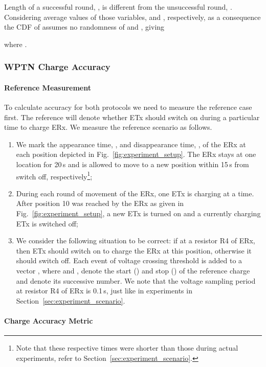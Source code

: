 \documentclass[11pt,draftclsnofoot,journal,onecolumn]{IEEEtran}
\newcommand{\rxVoltageThreshold}{}
\begin{document}
Length of a successful round, , is different from the unsuccessful round, . Considering average values of those variables,  and , respectively, as a consequence the CDF of  assumes no randomness of  and , giving

where .

\subsubsection{WPTN Charge Accuracy}
\label{sec:charge_accuracy_metric}

\paragraph{Reference Measurement}

To calculate accuracy for both protocols we need to measure the reference case first. The reference will denote whether ETx should switch on during a particular time to charge ERx. We measure the reference scenario as follows.
\begin{enumerate}
\item We mark the appearance time, , and disappearance time, , of the ERx at each position depicted in Fig.~\ref{fig:experiment_setup}. The ERx stays at one location for 20\,s and is allowed to move to a new position within 15\,s from switch off, respectively\footnote{Note that these respective times were shorter than those during actual experiments, refer to Section~\ref{sec:experiment_scenario}.};
\item During each round of movement of the ERx, one ETx is charging at a time. After position 10 was reached by the ERx as given in Fig.~\ref{fig:experiment_setup}, a new ETx is turned on and a currently charging ETx is switched off;
\item We consider the following situation to be correct: if \rxVoltageThreshold at a resistor R4 of ERx, then ETx  should switch on to charge the ERx at this position, otherwise it should switch off. Each event of voltage crossing threshold is added to a vector  , where  and ,  denote the start () and stop () of the reference charge and  denote its successive number. We note that the voltage sampling period at resistor R4 of ERx is 0.1\,s, just like in experiments in Section~\ref{sec:experiment_scenario}.
\end{enumerate}

\paragraph{Charge Accuracy Metric}
\end{document}
